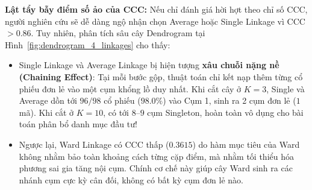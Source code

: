 \documentclass[12pt,a4paper,oneside,openany]{report}
\begin{document}
\textbf{Lật tẩy bẫy điểm số ảo của CCC:}  
Nếu chỉ đánh giá hời hợt theo chỉ số CCC, người nghiên cứu sẽ dễ dàng ngộ nhận chọn Average hoặc Single Linkage vì CCC $> 0.86$. Tuy nhiên, phân tích sâu cây Dendrogram tại Hình~\ref{fig:dendrogram_4_linkages} cho thấy:
\begin{itemize}
  \item Single Linkage và Average Linkage bị hiện tượng \textbf{xâu chuỗi nặng nề (Chaining Effect)}: Tại mỗi bước gộp, thuật toán chỉ kết nạp thêm từng cổ phiếu đơn lẻ vào một cụm khổng lồ duy nhất. Khi cắt cây ở $K = 3$, Single và Average dồn tới $96/98$ cổ phiếu ($98.0\%$) vào Cụm 1, sinh ra 2 cụm đơn lẻ ($1$ mã). Khi cắt ở $K = 10$, có tới $8$--$9$ cụm Singleton, hoàn toàn vô dụng cho bài toán phân bổ danh mục đầu tư!
  \item Ngược lại, Ward Linkage có CCC thấp ($0.3615$) do hàm mục tiêu của Ward không nhằm bảo toàn khoảng cách từng cặp điểm, mà nhằm tối thiểu hóa phương sai gia tăng nội cụm. Chính cơ chế này giúp cây Ward sinh ra các nhánh cụm cực kỳ cân đối, không có bất kỳ cụm đơn lẻ nào.
\end{itemize}
\end{document}
